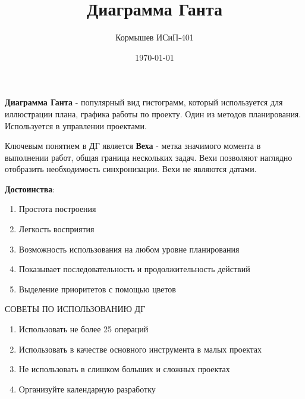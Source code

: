 \documentclass[11pt]{article}
\author{Кормышев ИСиП-401}
\date{\today}
\title{Диаграмма Ганта}
\begin{document}
\maketitle
\tableofcontents

\textbf{Диаграмма Ганта} - популярный вид гистограмм, который используется для иллюстрации плана, графика работы по проекту.
Один из методов планирования.
Используется в управлении проектами.

Ключевым понятием в ДГ является \textbf{Веха} - метка значимого момента в выполнении работ, общая граница нескольких задач.
Вехи позволяют наглядно отобразить необходимость синхронизации.
Вехи не являются датами.

\textbf{Достоинства}:

\begin{enumerate}
\item Простота построения
\item Легкость восприятия
\item Возможность использования на любом уровне планирования
\item Показывает последовательность и продолжительность действий
\item Выделение приоритетов с помощью цветов
\end{enumerate}


\begin{center}
СОВЕТЫ ПО ИСПОЛЬЗОВАНИЮ ДГ
\end{center}

\begin{enumerate}
\item Использовать не более 25 операций
\item Использовать в качестве основного инструмента в малых проектах
\item Не использовать в слишком больших и сложных проектах
\item Организуйте календарную разработку
\end{enumerate}
\end{document}
